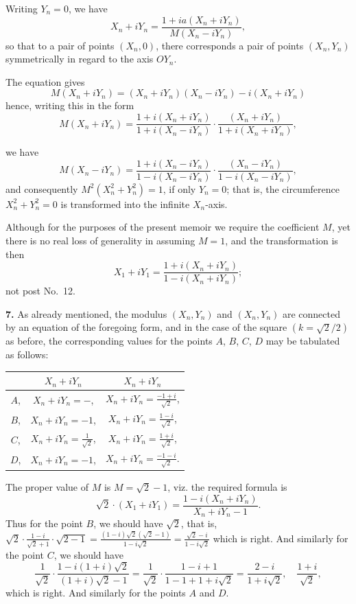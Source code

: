 \documentclass[11pt,a4paper]{article}
\begin{document}
Writing $Y_n = 0$, we have
\[
X_n + iY_n = \frac{1 + ia(X_n + iY_n)}{M(X_n - iY_n)},
\]
so that to a pair of points $(X_n, 0)$, there corresponds a pair of points $(X_n, Y_n)$ symmetrically in regard to the axis $OY_n$.

The equation gives
\[
M(X_n + iY_n) = (X_n + iY_n)(X_n - iY_n) - i(X_n + iY_n)
\]
hence, writing this in the form
\[
M(X_n + iY_n) = \frac{1 + i(X_n + iY_n)}{1 + i(X_n - iY_n)} \cdot \frac{(X_n + iY_n)}{1 + i(X_n + iY_n)},
\]

we have
\[
M(X_n - iY_n) = \frac{1 + i(X_n - iY_n)}{1 - i(X_n - iY_n)} \cdot \frac{(X_n - iY_n)}{1 - i(X_n - iY_n)},
\]
and consequently $M^2(X_n^2 + Y_n^2) = 1$, if only $Y_n = 0$; that is, the circumference $X_n^2 + Y_n^2 = 0$ is transformed into the infinite $X_n$-axis.

Although for the purposes of the present memoir we require the coefficient $M$, yet there is no real loss of generality in assuming $M = 1$, and the transformation is then
\[
X_1 + iY_1 = \frac{1 + i(X_n + iY_n)}{1 - i(X_n + iY_n)};
\]
not post No.\ 12.

\textbf{7.} As already mentioned, the modulus $(X_n, Y_n)$ and $(X_n, Y_n)$ are connected by an equation of the foregoing form, and in the case of the square $(k = \sqrt{2}/2)$ as before, the corresponding values for the points $A$, $B$, $C$, $D$ may be tabulated as follows:
\begin{center}
\begin{tabular}{c|c|c}
& $X_n + iY_n$ & $X_n + iY_n$ \\
\hline
$A$, & $X_n + iY_n = -$, & $X_n + iY_n = \frac{- 1 + i}{\sqrt{2}}$, \\
$B$, & $X_n + iY_n = -1$, & $X_n + iY_n = \frac{1 - i}{\sqrt{2}}$, \\
$C$, & $X_n + iY_n = \frac{1}{\sqrt{2}}$, & $X_n + iY_n = \frac{1 + i}{\sqrt{2}}$, \\
$D$, & $X_n + iY_n = -1$, & $X_n + iY_n = \frac{- 1 - i}{\sqrt{2}}$. \\
\end{tabular}
\end{center}

The proper value of $M$ is $M = \sqrt{2} - 1$, viz. the required formula is
\[
\sqrt{2} \cdot (X_1 + iY_1) = \frac{1 - i(X_n + iY_n)}{X_n + iY_n - 1}.
\]
Thus for the point $B$, we should have $\sqrt{2}$, that is, $\sqrt{2} \cdot \frac{1 - i}{\sqrt{2} + 1} \cdot \sqrt{2 - 1} = \frac{(1 - i)\sqrt{2}(\sqrt{2} - 1)}{1 - i\sqrt{2}} = \frac{\sqrt{2} - i}{1 - i\sqrt{2}}$
which is right. And similarly for the point $C$, we should have
\[
\frac{1}{\sqrt{2}} \cdot \frac{1 - i(1 + i)\sqrt{2}}{(1 + i)\sqrt{2} - 1} = \frac{1}{\sqrt{2}} \cdot \frac{1 - i + 1}{1 - 1 + 1 + i\sqrt{2}} = \frac{2 - i}{1 + i\sqrt{2}}, \quad \frac{1 + i}{\sqrt{2}},
\]
which is right. And similarly for the points $A$ and $D$.
\end{document}
